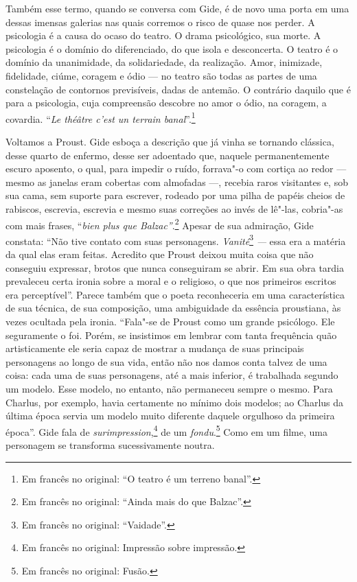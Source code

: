 Também esse termo, quando se conversa com Gide, é de novo uma porta em
uma dessas imensas galerias nas quais corremos o risco de quase nos
perder. A psicologia é a causa do ocaso do teatro. O drama psicológico,
sua morte. A psicologia é o domínio do diferenciado, do que isola e
desconcerta. O teatro é o domínio da unanimidade, da solidariedade, da
realização. Amor, inimizade, fidelidade, ciúme, coragem e ódio --- no
teatro são todas as partes de uma constelação de contornos previsíveis,
dadas de antemão. O contrário daquilo que é para a psicologia, cuja
compreensão descobre no amor o ódio, na coragem, a covardia. ``\emph{Le
théâtre c'est un terrain banal}''.\footnote{Em francês no original: ``O teatro é um terreno banal''. \versal{[N. T.]}}

Voltamos a Proust. Gide esboça a descrição que já vinha se tornando
clássica, desse quarto de enfermo, desse ser adoentado que, naquele
permanentemente escuro aposento, o qual, para impedir o ruído, forrava"-o
com cortiça ao redor --- mesmo as janelas eram cobertas com almofadas ---,
recebia raros visitantes e, sob sua cama, sem suporte para escrever,
rodeado por uma pilha de papéis cheios de rabiscos, escrevia, escrevia e
mesmo suas correções ao invés de lê"-las, cobria"-as com mais frases,
``\emph{bien plus que Balzac''}.\footnote{Em francês no original: ``Ainda mais do que
  Balzac''. \versal{[N. T.]}} Apesar de sua admiração, Gide constata: ``Não tive
contato com suas personagens. \emph{Vanité}\footnote{Em francês no original: ``Vaidade''. \versal{[N. T.]}} \emph{---} essa era a matéria da qual elas eram feitas. Acredito que
Proust deixou muita coisa que não conseguiu expressar, brotos que nunca
conseguiram se abrir. Em sua obra tardia prevaleceu certa ironia sobre a
moral e o religioso, o que nos primeiros escritos era perceptível''.
Parece também que o poeta reconheceria em uma característica de sua
técnica, de sua composição, uma ambiguidade da essência proustiana, às
vezes ocultada pela ironia. ``Fala"-se de Proust como um grande
psicólogo. Ele seguramente o foi. Porém, se insistimos em lembrar com
tanta frequência quão artisticamente ele seria capaz de mostrar a
mudança de suas principais personagens ao longo de sua vida, então não
nos damos conta talvez de uma coisa: cada uma de suas personagens, até a
mais inferior, é trabalhada segundo um modelo. Esse modelo, no entanto,
não permaneceu sempre o mesmo. Para Charlus, por exemplo, havia
certamente no mínimo dois modelos; ao Charlus da última época servia um
modelo muito diferente daquele orgulhoso da primeira época''. Gide fala
de \emph{surimpression},\footnote{Em francês no original: Impressão sobre impressão. \versal{[N. T.]}} de um \emph{fondu}.\footnote{Em francês no original: Fusão. \versal{[N. T.]}} Como em um filme, uma personagem se transforma sucessivamente
noutra.

